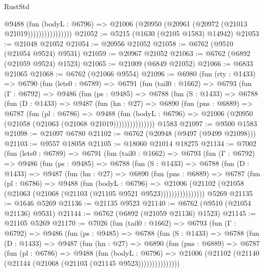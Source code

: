 \begin{lexlean}{RustStd}
\begin{coremodule}
                        @9488
                          (fun (bodyL : @6796) =>
                          @21006 (@20950 (@20961 (@20972 (@21013 @21019))))))))))))))))
@21052 := @5215 (@1630 (@2105 @1583) @14942)
@21053 := @21048 @21052
@21054 := @20956 @21052
@21058 := @6762 (@9510 (@21054 @9524) @9531)
@21059 := @20967 @21052
@21063 := @6762 (@6892 (@21059 @9524) @1523)
@21065 := @21009 (@6849 @21052)
@21066 := @6833 @21065
@21068 := @6762 (@21066 @9554)
@21096 := @6980
    (fun (rty : @1433) =>
    @6790
      (fun (lets0 : @6789) =>
      @6791
        (fun (tail0 : @1662) =>
        @6793
          (fun (Γ : @6792) =>
          @9486
            (fun (ps : @9485) =>
            @6788
              (fun (S : @1433) =>
              @6788
                (fun (D : @1433) =>
                @9487
                  (fun (hn : @27) =>
                  @6890
                    (fun (pns : @6889) =>
                    @6787
                      (fun (pl : @6786) =>
                      @9488
                        (fun (bodyL : @6796) =>
                        @21006 (@20950 (@21058 (@21063 (@21068 @21019)))))))))))))))
    @1583
@21097 := @9500 @1583
@21098 := @21097 @6780
@21102 := @6762 (@20948 (@9497 (@9499 @21098)))
@21103 := @9557 @18058
@21105 := @18060 @21014 @18275
@21134 := @7002
    (fun (lets0 : @6789) =>
    @6791
      (fun (tail0 : @1662) =>
      @6793
        (fun (Γ : @6792) =>
        @9486
          (fun (ps : @9485) =>
          @6788
            (fun (S : @1433) =>
            @6788
              (fun (D : @1433) =>
              @9487
                (fun (hn : @27) =>
                @6890
                  (fun (pns : @6889) =>
                  @6787
                    (fun (pl : @6786) =>
                    @9488
                      (fun (bodyL : @6796) =>
                      @21006
                        (@21102 (@21058 (@21063 (@21068 (@21103 (@21105 @9521 @9523))))))))))))))))
    @5269
@21135 := @1646 @5269
@21136 := @21135 @9523
@21140 := @6762 (@9510 (@21054 @21136) @9531)
@21144 := @6762 (@6892 (@21059 @21136) @1523)
@21145 := @21105 @5269
@21170 := @7026
    (fun (tail0 : @1662) =>
    @6793
      (fun (Γ : @6792) =>
      @9486
        (fun (ps : @9485) =>
        @6788
          (fun (S : @1433) =>
          @6788
            (fun (D : @1433) =>
            @9487
              (fun (hn : @27) =>
              @6890
                (fun (pns : @6889) =>
                @6787
                  (fun (pl : @6786) =>
                  @9488
                    (fun (bodyL : @6796) =>
                    @21006 (@21102 (@21140 (@21144 (@21068 (@21103 (@21145 @9523)))))))))))))))

\end{coremodule}
\end{lexlean}

